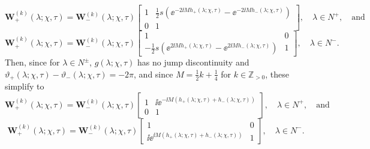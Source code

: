 \begin{equation}
\mathbf{W}^{(k)}_+(\lambda;\chi,\tau)=\mathbf{W}_-^{(k)}(\lambda;\chi,\tau)\begin{bmatrix}1 & \tfrac{1}{2}s\left(\ee^{-2\ii Mh_+(\lambda;\chi,\tau)}-\ee^{-2\ii Mh_-(\lambda;\chi,\tau)}\right)\\0 & 1\end{bmatrix},\quad
\lambda\in N^+,\quad\text{and}
\end{equation}
\begin{equation}
\mathbf{W}^{(k)}_+(\lambda;\chi,\tau)=\mathbf{W}^{(k)}_-(\lambda;\chi,\tau)\begin{bmatrix}1 & 0\\
-\tfrac{1}{2}s\left(\ee^{2\ii Mh_+(\lambda;\chi,\tau)}-\ee^{2\ii Mh_-(\lambda;\chi,\tau)}\right) & 1\end{bmatrix},\quad\lambda\in N^-.
\end{equation}
Then, since for $\lambda\in N^\pm$, $g(\lambda;\chi,\tau)$ has no jump discontinuity and $\vartheta_+(\lambda;\chi,\tau)-\vartheta_-(\lambda;\chi,\tau)=-2\pi$, and since $M=\tfrac{1}{2}k+\tfrac{1}{4}$ for $k\in\mathbb{Z}_{>0}$, these simplify to
\begin{equation}
\mathbf{W}^{(k)}_+(\lambda;\chi,\tau)=\mathbf{W}^{(k)}_-(\lambda;\chi,\tau)\begin{bmatrix}1 & \ii\ee^{-\ii M(h_+(\lambda;\chi,\tau)+h_-(\lambda;\chi,\tau))}\\0 & 1\end{bmatrix},\quad\lambda\in N^+,\quad\text{and}
\end{equation}
\begin{equation}
\mathbf{W}^{(k)}_+(\lambda;\chi,\tau)=\mathbf{W}^{(k)}_-(\lambda;\chi,\tau)\begin{bmatrix}1 & 0\\
\ii\ee^{\ii M(h_+(\lambda;\chi,\tau)+h_-(\lambda;\chi,\tau))} & 1\end{bmatrix},\quad\lambda\in N^-.
\end{equation}

